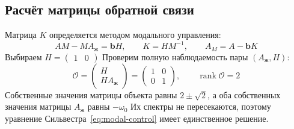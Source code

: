 \subsection{Расчёт матрицы обратной связи}

Матрица $K$ определяется методом модального управления:
\begin{equation}
  AM-MA_{\text{ж}}=\bm b H,
  \qquad K=HM^{-1},
  \qquad A_M=A-\bm b K
  \label{eq:modal-control}
\end{equation}
Выбираем $H=\begin{pmatrix}1&0\end{pmatrix}$ Проверим полную
наблюдаемость пары $(A_{\text{ж}},H)$:
\begin{equation}
  \mathcal O=\begin{pmatrix}H\\HA_{\text{ж}}\end{pmatrix}
  =\begin{pmatrix}1&0\\0&1\end{pmatrix},
  \qquad \operatorname{rank}\mathcal O=2
  \label{eq:desired-observability}
\end{equation}
Собственные значения матрицы объекта равны $2\pm\sqrt2$, а оба собственных
значения матрицы $A_{\text{ж}}$ равны $-\omega_0$ Их спектры не пересекаются, поэтому
уравнение Сильвестра~\eqref{eq:modal-control} имеет единственное решение.

